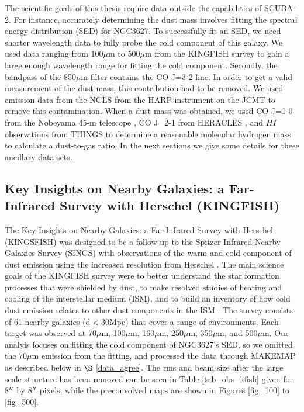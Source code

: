 The scientific goals of this thesis require data outside the capabilities of SCUBA-2.  For instance, accurately determining the dust mass involves fitting the spectral energy distribution (SED) for NGC3627.  To successfully fit an SED, we need shorter wavelength data to fully probe the cold component of this galaxy. We used data ranging from 100$\mu$m to 500$\mu$m from the KINGFISH survey \citep{kennicutt2011} to gain a large enough wavelength range for fitting the cold component.  Secondly, the bandpass of the 850$\mu$m filter contains the CO J=3-2 line.  In order to get a valid measurement of the dust mass, this contribution had to be removed.  We used emission data from the NGLS from the HARP instrument on the JCMT \citep{wilson2012} to remove this contamination.  When a dust mass was obtained, we used CO J=1-0 from the Nobeyama 45-m telescope \citep{kuno2007}, CO J=2-1 from HERACLES \citep{leroy2009}, and $HI$ observations from THINGS \citep{walter2008} to determine a reasonable molecular hydrogen mass to calculate a dust-to-gas ratio.  In the next sections we give some details for these ancillary data sets.

\subsection{Key Insights on Nearby Galaxies: a Far-Infrared Survey with Herschel (KINGFISH)}

The Key Insights on Nearby Galaxies: a Far-Infrared Survey with Herschel (KINGSFISH) was designed to be a follow up to the Spitzer Infrared Nearby Galaxies Survey (SINGS) \citep{kennicutt2003} with observations of the warm and cold component of dust emission using the increased resolution from Herschel \citep{kennicutt2011}.  The main science goals of the KINGFISH survey were to better understand the star formation processes that were shielded by dust, to make resolved studies of heating and cooling of the interstellar medium (ISM), and to build an inventory of how cold dust emission relates to other dust components in the ISM \citep{kennicutt2011}.  The survey consists of 61 nearby galaxies (d$<$30Mpc) that cover a range of environments.  Each target was observed at 70$\mu$m, 100$\mu$m, 160$\mu$m, 250$\mu$m, 350$\mu$m, and 500$\mu$m.  Our analyis focuses on fitting the cold component of NGC3627's SED, so we omitted the 70$\mu$m emission from the fitting, and processed the data through MAKEMAP as described below in $\S$ \ref{data_agree}.  The rms and beam size after the large scale structure has been removed can be seen in Table \ref{tab_obs_kfish} given for 8$\mbox{$^{\prime\prime}$}$ by 8$\mbox{$^{\prime\prime}$}$ pixels, while the preconvolved maps are shown in Figures \ref{fig_100} to \ref{fig_500}.

